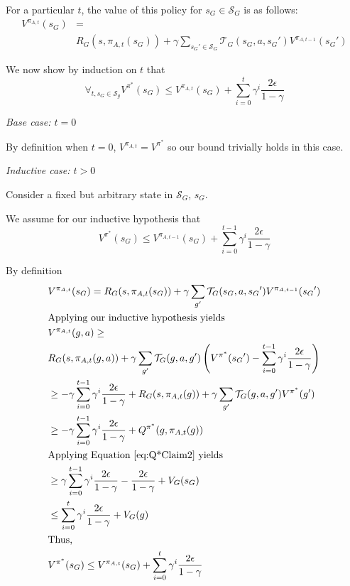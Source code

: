 For a particular $t$, the value of this policy for $s_G \in \mathcal{S}_G$ is as follows:
\begin{align*}
V^{\pi_{A,t}}(s_G) &= \\
&R_G(s, \pi_{A,t}(s_G)) + \gamma \sum_{{s_G}' \in \mathcal{S}_G}\mathcal{T}_G(s_G, a, {s_G}')V^{\pi_{A,t-1}}({s_G}')
\end{align*}

We now show by induction on $t$ that
\begin{equation}
\forall_{t, s_G \in \mathcal{S}_g} V^{\pi^*}(s_G) \leq  V^{\pi_{A,t}}(s_G) + \sum_{i=0}^{t}\gamma^i \frac{2\epsilon}{1-\gamma}
\end{equation}


\textit{Base case: $t=0$}

By definition when $t=0$, $V^{\pi_{A,t}} = V^{\pi^*}$ so our bound trivially holds in this case.

\textit{Inductive case: $t > 0$}

Consider a fixed but arbitrary state in $\mathcal{S}_G$, $s_G$.

We assume for our inductive hypothesis that
\begin{equation}
V^{\pi^*}(s_G) \leq V^{\pi_{A,t-1}}(s_G)  + \sum_{i=0}^{t-1}\gamma^i \frac{2\epsilon}{1-\gamma}
\end{equation}

By definition 
\begin{align*}
&V^{\pi_{A,t}}(s_G) = R_G(s, \pi_{A,t}(s_G)) + \gamma \sum_{g'}\mathcal{T}_G(s_G, a, {s_G}')V^{\pi_{A,t-1}}({s_G}')\\
&\text{Applying our inductive hypothesis yields}\\
&V^{\pi_{A,t}}(g, a) \geq\\
&R_G(s, \pi_{A,t}(g, a)) + \gamma \sum_{g'}\mathcal{T}_G(g, a, g')\left(V^{\pi^*}({s_G}') - \sum_{i=0}^{t-1}\gamma^i \frac{2\epsilon}{1-\gamma} \right)\\
&\geq -\gamma\sum_{i=0}^{t-1}\gamma^i \frac{2\epsilon}{1-\gamma} + R_G(s, \pi_{A,t}(g)) + \gamma \sum_{g'}\mathcal{T}_G(g, a, g')V^{\pi^*}(g')\\
&\geq -\gamma\sum_{i=0}^{t-1}\gamma^i \frac{2\epsilon}{1-\gamma} + Q^{\pi^*}(g, \pi_{A,t} (g))\\
&\text{Applying Equation \ref{eq:Q*Claim2} yields}\\
&\geq \gamma\sum_{i=0}^{t-1}\gamma^i \frac{2\epsilon}{1-\gamma} - \frac{2\epsilon}{1-\gamma} + V_{G}(s_G)\\
&\leq \sum_{i=0}^{t}\gamma^i \frac{2\epsilon}{1-\gamma} + V_G(g)\\
& \text{Thus,}\\
&V^{\pi^*}(s_G) \leq V^{\pi_{A,t}}(s_G)  + \sum_{i=0}^{t}\gamma^i \frac{2\epsilon}{1-\gamma}
\end{align*}


